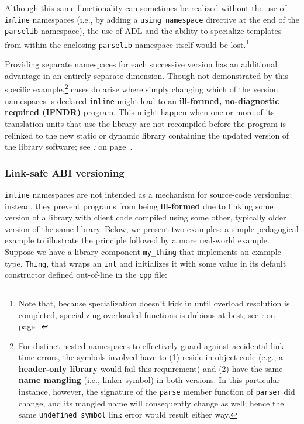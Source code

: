 Although this same functionality can sometimes be realized without the
use of \texttt{inline} namespaces (i.e., by adding a
\texttt{using}~\texttt{namespace} directive at the end of the
\texttt{parselib} namespace), the use of ADL and the ability to
specialize templates from within the enclosing \texttt{parselib}
namespace itself would be lost.{\cprotect\footnote{Note that, because
specialization doesn't kick in until overload resolution is completed,
specializing overloaded functions is dubious at best; see \textit{: } on page~\pageref{specializing-templates-in-std-can-be-problematic}.}}

Providing separate namespaces for each successive version has an
additional advantage in an entirely separate dimension. Though not
demonstrated by this specific example,{\cprotect\footnote{For distinct
nested namespaces to effectively guard against accidental link-time
errors, the symbols involved have to (1) reside in object code (e.g.,
a \textbf{header-only library} would fail this requirement) and (2)
have the same \textbf{name mangling} (i.e., linker symbol) in both
versions. In this particular instance, however, the signature of the
\texttt{parse} member function of \texttt{parser} did change, and its
mangled name will consequently change as well; hence the same
  \texttt{undefined}~\texttt{symbol} link error would result either way.}}
cases do arise where simply changing which of the version namespaces is
declared \texttt{inline} might lead to an \textbf{ill-formed, no-diagnostic
required (IFNDR)} program. This might happen when one or more of
its translation units that use the library are not recompiled before the
program is relinked to the new static or dynamic library containing the
updated version of the library software; see \textit{: } on page~\pageref{link-safe-abi-versioning}.

\subsubsection[Link-safe ABI versioning]{Link-safe ABI versioning}\label{link-safe-abi-versioning}

\texttt{inline} namespaces are not intended as a mechanism for
source-code versioning; instead, they prevent programs from being
\textbf{ill-formed} due to linking some version of a library with client
code compiled using some other, typically older version of the same
library. Below, we present two examples: a simple pedagogical example
to illustrate the principle followed by a more real-world example.
Suppose we have a library component \texttt{my\_thing} that implements
an example type, \texttt{Thing}, that wraps an \texttt{int} and
initializes it with some value in its default constructor defined
out-of-line in the \texttt{cpp} file:

